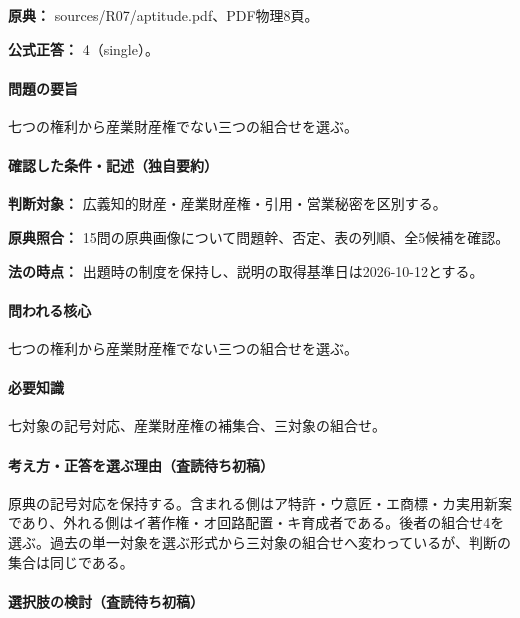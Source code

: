 \noindent\textbf{原典：} sources/R07/aptitude.pdf、PDF物理8頁。

\textbf{公式正答：} 4（single）。

\paragraph{問題の要旨} 七つの権利から産業財産権でない三つの組合せを選ぶ。

\paragraph{確認した条件・記述（独自要約）}\mbox{}\par

\noindent\textbf{判断対象：} 広義知的財産・産業財産権・引用・営業秘密を区別する。\par

\noindent\textbf{原典照合：} 15問の原典画像について問題幹、否定、表の列順、全5候補を確認。\par

\noindent\textbf{法の時点：} 出題時の制度を保持し、説明の取得基準日は2026-10-12とする。\par

\paragraph{問われる核心} 七つの権利から産業財産権でない三つの組合せを選ぶ。

\paragraph{必要知識} 七対象の記号対応、産業財産権の補集合、三対象の組合せ。

\paragraph{考え方・正答を選ぶ理由（査読待ち初稿）} 原典の記号対応を保持する。含まれる側はア特許・ウ意匠・エ商標・カ実用新案であり、外れる側はイ著作権・オ回路配置・キ育成者である。後者の組合せ4を選ぶ。過去の単一対象を選ぶ形式から三対象の組合せへ変わっているが、判断の集合は同じである。

\paragraph{選択肢の検討（査読待ち初稿）}\mbox{}\par

